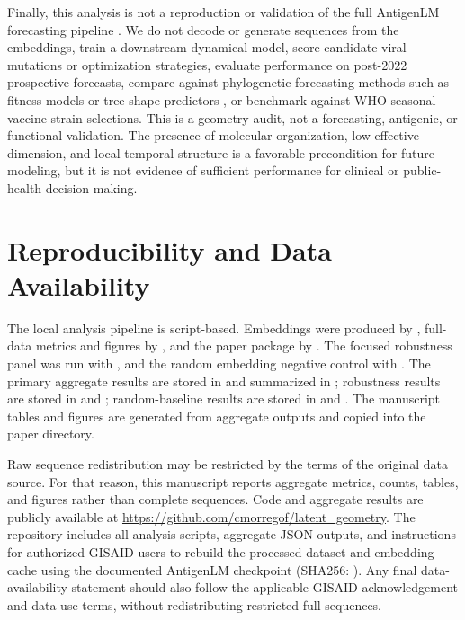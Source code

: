 \documentclass[11pt]{article}
\begin{document}
Finally, this analysis is not a reproduction or validation of the full AntigenLM forecasting pipeline \cite{pei2026antigenlm}. We do not decode or generate sequences from the embeddings, train a downstream dynamical model, score candidate viral mutations or optimization strategies, evaluate performance on post-2022 prospective forecasts, compare against phylogenetic forecasting methods such as fitness models or tree-shape predictors \cite{luksza2014fitness,neher2014predicting}, or benchmark against WHO seasonal vaccine-strain selections. This is a geometry audit, not a forecasting, antigenic, or functional validation. The presence of molecular organization, low effective dimension, and local temporal structure is a favorable precondition for future modeling, but it is not evidence of sufficient performance for clinical or public-health decision-making.

\section{Reproducibility and Data Availability}

The local analysis pipeline is script-based. Embeddings were produced by , full-data metrics and figures by , and the paper package by . The focused robustness panel was run with , and the random embedding negative control with . The primary aggregate results are stored in  and summarized in ; robustness results are stored in  and ; random-baseline results are stored in  and . The manuscript tables and figures are generated from aggregate outputs and copied into the paper directory.

Raw sequence redistribution may be restricted by the terms of the original data source. For that reason, this manuscript reports aggregate metrics, counts, tables, and figures rather than complete sequences. Code and aggregate results are publicly available at \url{https://github.com/cmorregof/latent_geometry}. The repository includes all analysis scripts, aggregate JSON outputs, and instructions for authorized GISAID users to rebuild the processed dataset and embedding cache using the documented AntigenLM checkpoint (SHA256: ). Any final data-availability statement should also follow the applicable GISAID acknowledgement and data-use terms, without redistributing restricted full sequences.
\end{document}
